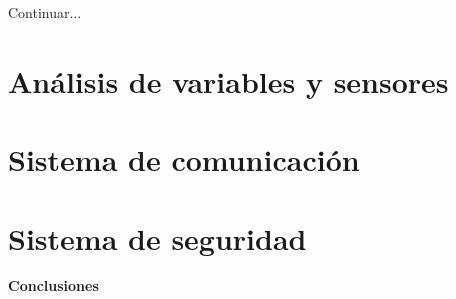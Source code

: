     Continuar...


    \section{Análisis de variables y sensores}\label{sec: analisisVariables}

    \section{Sistema de comunicación}\label{sec: sistemaComunicación}

    \section{Sistema de seguridad}\label{sec: sistemaSeguridad}

    \textbf{\Large Conclusiones}\newline